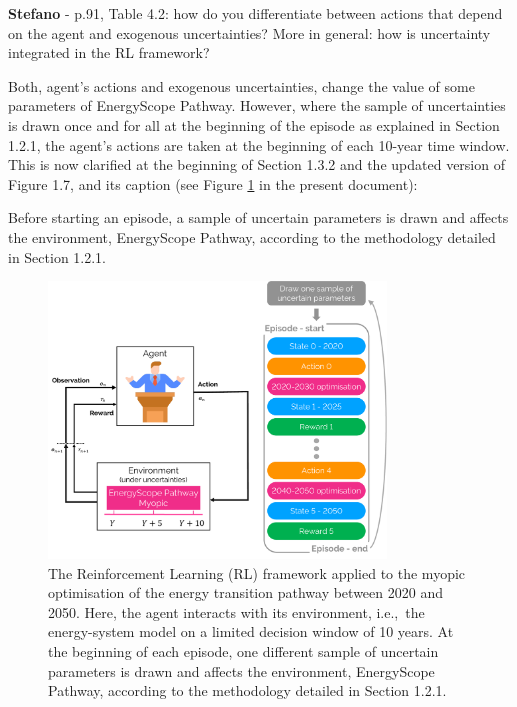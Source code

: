 \documentclass[12pt,a4paper]{article}
\def\ie{i.e.,\ }
\begin{document}
\begin{mdframed}[style=comment] %
{\color{orange} \textbf{Stefano}} - p.91, Table 4.2: how do you differentiate between actions that depend on the agent and exogenous uncertainties? More in general: how is uncertainty integrated in the RL framework?
\end{mdframed}

\noindent Both, agent's actions and exogenous uncertainties, change the value of some parameters of EnergyScope Pathway. However, where the sample of uncertainties is drawn once and for all at the beginning of the episode as explained in Section 1.2.1, the agent's actions are taken at the beginning of each 10-year time window. This is now clarified {\color{blue}at the beginning of Section 1.3.2 and the updated version of Figure 1.7, and its caption} (see Figure \ref{fig:Schematics_RL} in the present document):

\begin{mdframed}[style=manuscript] %
Before starting an episode, a sample of uncertain parameters is drawn and affects the environment, EnergyScope Pathway, according to the methodology detailed in Section 1.2.1. 
\end{mdframed}

\begin{figure}[!htbp]
\centering
\includegraphics[width=0.8\textwidth]{Schematics_RL.pdf}
\caption{The Reinforcement Learning (RL) framework applied to the myopic optimisation of the energy transition pathway between 2020 and 2050. Here, the agent interacts with its environment, \ie the energy-system model on a limited decision window of 10 years. At the beginning of each episode, one different sample of uncertain parameters is drawn and affects the environment, EnergyScope Pathway, according to the methodology detailed in Section 1.2.1.}
\label{fig:Schematics_RL}
\end{figure}
\end{document}
